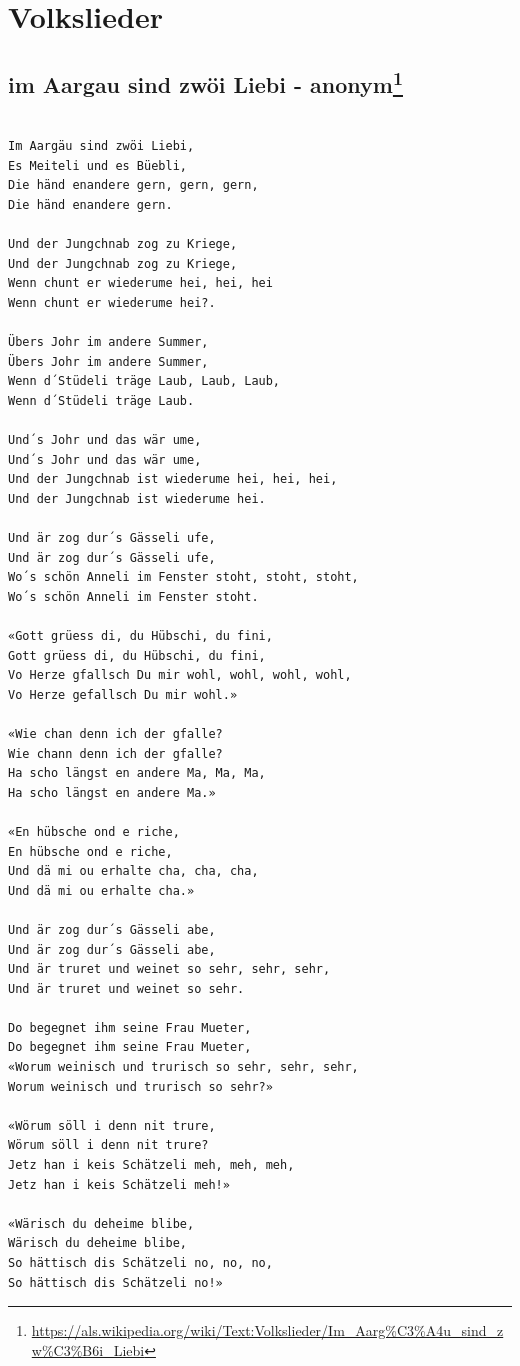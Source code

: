 \documentclass[
]{book}
\let\stdsection\section
\renewcommand\section{\clearpage\stdsection}
\begin{document}
\hypertarget{volkslieder}{%
\chapter{Volkslieder}\label{volkslieder}}

\hypertarget{volkslieder-im-aargau}{%
\section[im Aargau sind zwöi Liebi - anonym]{\texorpdfstring{im Aargau sind zwöi Liebi - anonym\footnote{\url{https://als.wikipedia.org/wiki/Text:Volkslieder/Im_Aarg\%C3\%A4u_sind_zw\%C3\%B6i_Liebi}}}{im Aargau sind zwöi Liebi - anonym}}\label{volkslieder-im-aargau}}

\begin{verbatim}

Im Aargäu sind zwöi Liebi,
Es Meiteli und es Büebli,
Die händ enandere gern, gern, gern,
Die händ enandere gern.

Und der Jungchnab zog zu Kriege,
Und der Jungchnab zog zu Kriege,
Wenn chunt er wiederume hei, hei, hei
Wenn chunt er wiederume hei?.

Übers Johr im andere Summer,
Übers Johr im andere Summer,
Wenn d´Stüdeli träge Laub, Laub, Laub,
Wenn d´Stüdeli träge Laub.

Und´s Johr und das wär ume,
Und´s Johr und das wär ume,
Und der Jungchnab ist wiederume hei, hei, hei,
Und der Jungchnab ist wiederume hei.

Und är zog dur´s Gässeli ufe,
Und är zog dur´s Gässeli ufe,
Wo´s schön Anneli im Fenster stoht, stoht, stoht,
Wo´s schön Anneli im Fenster stoht.

«Gott grüess di, du Hübschi, du fini,
Gott grüess di, du Hübschi, du fini,
Vo Herze gfallsch Du mir wohl, wohl, wohl, wohl,
Vo Herze gefallsch Du mir wohl.»

«Wie chan denn ich der gfalle?
Wie chann denn ich der gfalle?
Ha scho längst en andere Ma, Ma, Ma,
Ha scho längst en andere Ma.»

«En hübsche ond e riche,
En hübsche ond e riche,
Und dä mi ou erhalte cha, cha, cha,
Und dä mi ou erhalte cha.»

Und är zog dur´s Gässeli abe,
Und är zog dur´s Gässeli abe,
Und är truret und weinet so sehr, sehr, sehr,
Und är truret und weinet so sehr.

Do begegnet ihm seine Frau Mueter,
Do begegnet ihm seine Frau Mueter,
«Worum weinisch und trurisch so sehr, sehr, sehr,
Worum weinisch und trurisch so sehr?»

«Wörum söll i denn nit trure,
Wörum söll i denn nit trure?
Jetz han i keis Schätzeli meh, meh, meh,
Jetz han i keis Schätzeli meh!»

«Wärisch du deheime blibe,
Wärisch du deheime blibe,
So hättisch dis Schätzeli no, no, no,
So hättisch dis Schätzeli no!» 
\end{verbatim}
\end{document}

